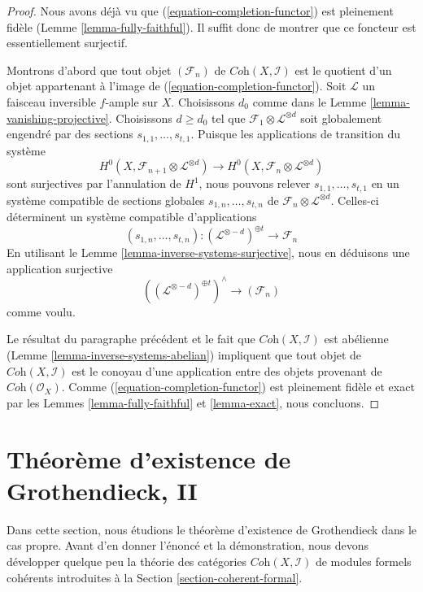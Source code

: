 \begin{proof}
Nous avons déjà vu que (\ref{equation-completion-functor}) est
pleinement fidèle (Lemme \ref{lemma-fully-faithful}). Il suffit donc
de montrer que ce foncteur est essentiellement surjectif.

\medskip\noindent
Montrons d'abord que tout objet $(\mathcal{F}_n)$ de
$\textit{Coh}(X, \mathcal{I})$ est le quotient d'un objet
appartenant à l'image de (\ref{equation-completion-functor}).
Soit $\mathcal{L}$ un faisceau inversible $f$-ample sur $X$.
Choisissons $d_0$ comme dans le Lemme \ref{lemma-vanishing-projective}.
Choisissons $d \geq d_0$ tel que
$\mathcal{F}_1 \otimes \mathcal{L}^{\otimes d}$
soit globalement engendré par des sections $s_{1, 1}, \ldots, s_{t, 1}$.
Puisque les applications de transition du système
$$
H^0(X, \mathcal{F}_{n + 1} \otimes \mathcal{L}^{\otimes d})
\longrightarrow
H^0(X, \mathcal{F}_n \otimes \mathcal{L}^{\otimes d})
$$
sont surjectives par l'annulation de $H^1$, nous pouvons relever
$s_{1, 1}, \ldots, s_{t, 1}$ en un système compatible de sections globales
$s_{1, n}, \ldots, s_{t, n}$ de
$\mathcal{F}_n \otimes \mathcal{L}^{\otimes d}$.
Celles-ci déterminent un système compatible d'applications
$$
(s_{1, n}, \ldots, s_{t, n}) :
(\mathcal{L}^{\otimes -d})^{\oplus t} \longrightarrow \mathcal{F}_n
$$
En utilisant le Lemme \ref{lemma-inverse-systems-surjective},
nous en déduisons une application surjective
$$
\left((\mathcal{L}^{\otimes -d})^{\oplus t}\right)^\wedge
\longrightarrow
(\mathcal{F}_n)
$$
comme voulu.

\medskip\noindent
Le résultat du paragraphe précédent et le fait que
$\textit{Coh}(X, \mathcal{I})$ est abélienne
(Lemme \ref{lemma-inverse-systems-abelian})
impliquent que
tout objet de $\textit{Coh}(X, \mathcal{I})$ est le conoyau
d'une application entre des objets provenant de $\textit{Coh}(\mathcal{O}_X)$.
Comme (\ref{equation-completion-functor}) est pleinement fidèle et exact par
les Lemmes \ref{lemma-fully-faithful} et \ref{lemma-exact},
nous concluons.
\end{proof}








\section{Théorème d'existence de Grothendieck, II}
\label{section-existence-proper}

\noindent
Dans cette section, nous étudions le théorème d'existence de Grothendieck dans
le cas propre. Avant d'en donner l'énoncé et la démonstration, nous devons
développer quelque peu la théorie des catégories
$\textit{Coh}(X, \mathcal{I})$ de modules formels cohérents
introduites à la Section \ref{section-coherent-formal}.

